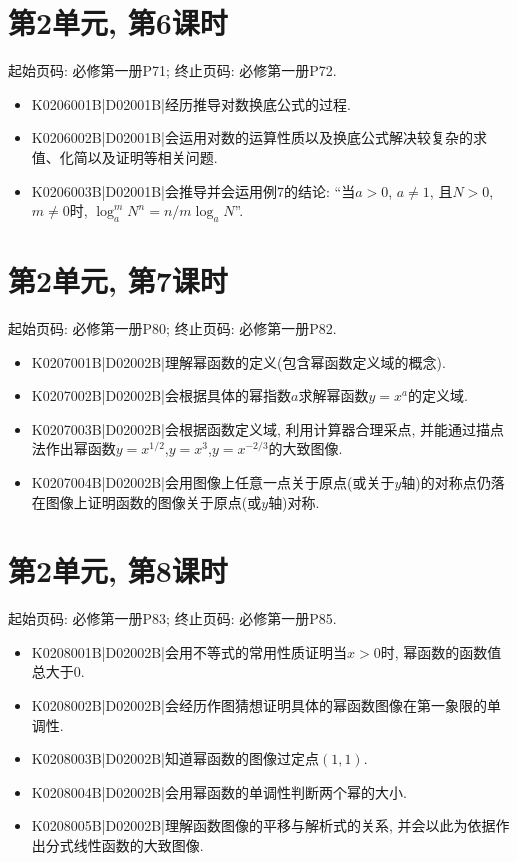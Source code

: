 \section*{第2单元, 第6课时}
起始页码: 必修第一册P71; 终止页码: 必修第一册P72.
\begin{itemize}
\item K0206001B|D02001B|经历推导对数换底公式的过程.
\item K0206002B|D02001B|会运用对数的运算性质以及换底公式解决较复杂的求值、化简以及证明等相关问题.
\item K0206003B|D02001B|会推导并会运用例7的结论: ``当$a>0$, $a\neq1$, 且$N>0$, $m\neq0$时, $\log_a^{m}N^{n}=n/m\log_aN$''.
\end{itemize}

\section*{第2单元, 第7课时}
起始页码: 必修第一册P80; 终止页码: 必修第一册P82.
\begin{itemize}
\item K0207001B|D02002B|理解幂函数的定义(包含幂函数定义域的概念).
\item K0207002B|D02002B|会根据具体的幂指数$a$求解幂函数$y=x^{a}$的定义域.
\item K0207003B|D02002B|会根据函数定义域, 利用计算器合理采点, 并能通过描点法作出幂函数$y=x^{1/2}$,$y=x^{3}$,$y=x^{-2/3}$的大致图像.
\item K0207004B|D02002B|会用图像上任意一点关于原点(或关于$y$轴)的对称点仍落在图像上证明函数的图像关于原点(或$y$轴)对称.
\end{itemize}

\section*{第2单元, 第8课时}
起始页码: 必修第一册P83; 终止页码: 必修第一册P85.
\begin{itemize}
\item K0208001B|D02002B|会用不等式的常用性质证明当$x>0$时, 幂函数的函数值总大于$0$.
\item K0208002B|D02002B|会经历作图猜想证明具体的幂函数图像在第一象限的单调性.
\item K0208003B|D02002B|知道幂函数的图像过定点$(1,1)$.
\item K0208004B|D02002B|会用幂函数的单调性判断两个幂的大小.
\item K0208005B|D02002B|理解函数图像的平移与解析式的关系, 并会以此为依据作出分式线性函数的大致图像.
\end{itemize}

